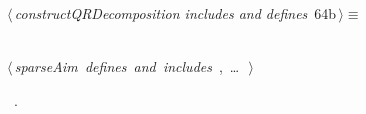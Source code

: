 \documentclass{article}
\begin{document}
\begin{flushleft} \small
\begin{minipage}{\linewidth}\label{scrap95}\raggedright\small
{} $\langle\,${\itshape constructQRDecomposition includes and defines}\nobreak\ {\footnotesize {64b}}$\,\rangle\equiv$
\vspace{-1ex}
\begin{list}{}{} \item
\mbox{}\verb@@\\
\mbox{}\verb@@\hbox{$\langle\,${\itshape sparseAim defines and includes}\nobreak\ {\footnotesize {}, \ldots\ }$\,\rangle$}\verb@@\\
\mbox{}\verb@@{\NWsep}
\end{list}
\vspace{-1.5ex}
\footnotesize
\begin{list}{}{\setlength{\itemsep}{-\parsep}\setlength{\itemindent}{-\leftmargin}}
\item \NWtxtMacroRefIn\ .

\item{}
\end{list}
\end{minipage}\vspace{4ex}
\end{flushleft}
\end{document}
